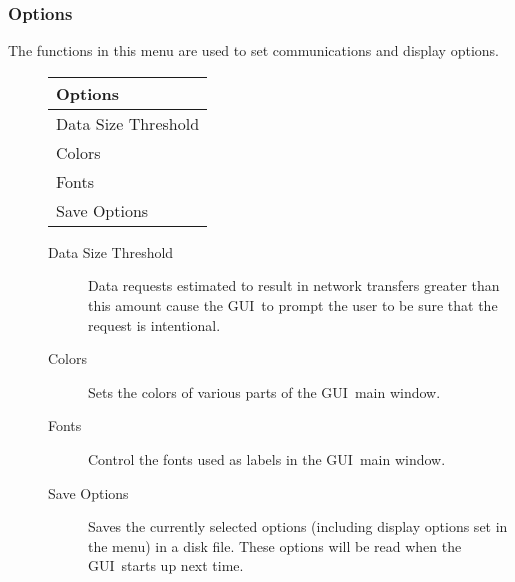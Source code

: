 \documentclass[10pt]{report}
\newcommand{\gui}{GUI}
\begin{document}
\subsubsection{Options}
\label{sec:menu:options}
The functions in this menu are used to set communications and
display options.
\begin{description}
\item[] 
  \begin{center}
    \begin{tabular}[c]{|l|} \hline
      \textbf{Options} \\ \hline
      Data Size Threshold \\
      Colors \\
      Fonts \\
      Save Options \\ \hline
    \end{tabular}
  \end{center}
  \begin{description}
  \item[Data Size Threshold]  Data requests estimated to result in
    network transfers greater than this amount cause the \gui\ to
    prompt the user to be sure that the request is intentional.
  \item[Colors] Sets the colors of various parts of the \gui\ main
    window. 
  \item[Fonts]  Control the fonts used as labels in the \gui\ main
    window. 
  \item[Save Options] Saves the currently selected options (including
    display options set in the  menu) in a disk file.
    These options will be read when the \gui\ starts up next time.
  \end{description}
\end{description}
\end{document}
